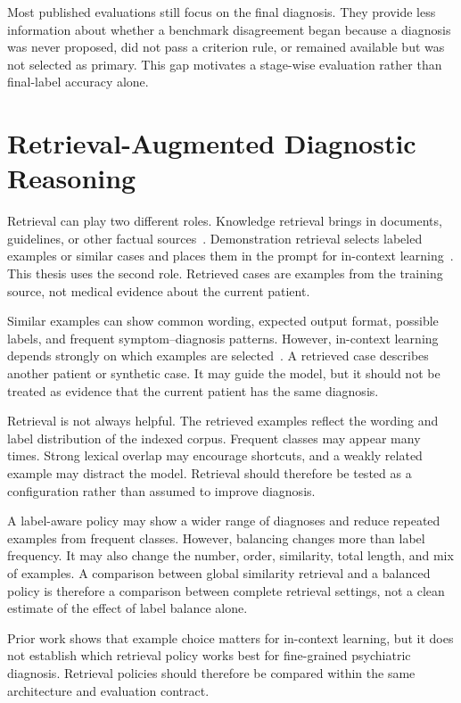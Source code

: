 Most published evaluations still focus on the final diagnosis. They provide less information about whether a benchmark disagreement began because a diagnosis was never proposed, did not pass a criterion rule, or remained available but was not selected as primary. This gap motivates a stage-wise evaluation rather than final-label accuracy alone.

\section{Retrieval-Augmented Diagnostic Reasoning}

Retrieval can play two different roles. Knowledge retrieval brings in documents, guidelines, or other factual sources~\citep{lewis2020rag}. Demonstration retrieval selects labeled examples or similar cases and places them in the prompt for in-context learning~\citep{liu2022incontext}. This thesis uses the second role. Retrieved cases are examples from the training source, not medical evidence about the current patient.

Similar examples can show common wording, expected output format, possible labels, and frequent symptom--diagnosis patterns. However, in-context learning depends strongly on which examples are selected~\citep{liu2022incontext}. A retrieved case describes another patient or synthetic case. It may guide the model, but it should not be treated as evidence that the current patient has the same diagnosis.

Retrieval is not always helpful. The retrieved examples reflect the wording and label distribution of the indexed corpus. Frequent classes may appear many times. Strong lexical overlap may encourage shortcuts, and a weakly related example may distract the model. Retrieval should therefore be tested as a configuration rather than assumed to improve diagnosis.

A label-aware policy may show a wider range of diagnoses and reduce repeated examples from frequent classes. However, balancing changes more than label frequency. It may also change the number, order, similarity, total length, and mix of examples. A comparison between global similarity retrieval and a balanced policy is therefore a comparison between complete retrieval settings, not a clean estimate of the effect of label balance alone.

Prior work shows that example choice matters for in-context learning, but it does not establish which retrieval policy works best for fine-grained psychiatric diagnosis. Retrieval policies should therefore be compared within the same architecture and evaluation contract.

